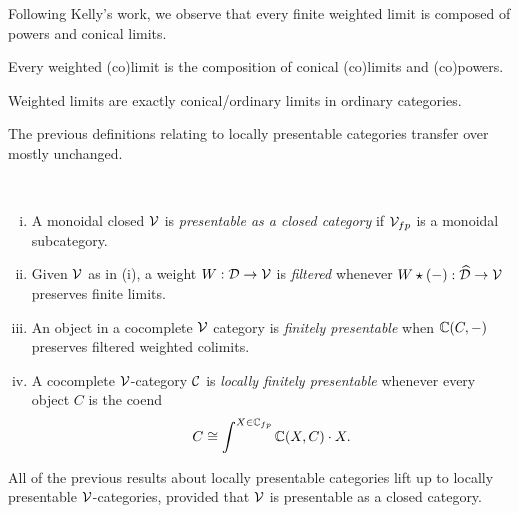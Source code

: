 Following Kelly's work, we observe that every finite weighted limit is composed of powers and conical limits.
\begin{proposition}
	Every weighted (co)limit is the composition of conical (co)limits and (co)powers.
\end{proposition}
\begin{corollary}
	Weighted limits are exactly conical/ordinary limits in ordinary categories.
\end{corollary}

The previous definitions relating to locally presentable categories transfer over mostly unchanged.
\begin{definition}%
    \label{def:v-lfp}
	~\begin{enumerate}[(i)]
		\item A monoidal closed $\mathcal{V}$ is \emph{presentable as a closed category} if $\mathcal{V}_{fp}$ is a monoidal subcategory.
		\item Given $\mathcal{V}$ as in (i), a weight $W: \mathcal{D} \to \mathcal{V}$ is \emph{filtered} whenever $W\star (-): \widehat{\mathcal{D}} \to \mathcal{V}$ preserves finite limits.
		\item An object in a cocomplete $\mathcal{V}$ category is \emph{finitely presentable} when $\mathbb{C}(C,-)$ preserves filtered weighted colimits.
		\item A cocomplete $\mathcal{V}$-category $\mathcal{C}$ is \emph{locally finitely presentable} whenever every object $C$ is the coend 
			\[C \cong \int^{X \in \mathbb{C}_{fp}}\mathbb{C}(X,C)\cdot X. \]
	\end{enumerate}
\end{definition}
\begin{proposition}%
    \label{prop:v-lfp}
	All of the previous results about locally presentable categories lift up to locally presentable $\mathcal{V}$-categories, provided that $\mathcal{V}$ is presentable as a closed category.
\end{proposition}

